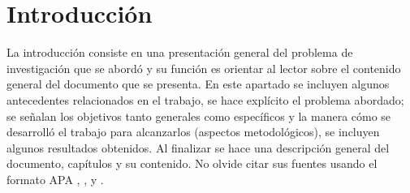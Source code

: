 \chapter{Introducción}



La introducción consiste en una presentación general del problema de 
investigación que se abordó y su función es orientar al lector sobre 
el contenido general del documento que se presenta. En este apartado 
se incluyen algunos antecedentes relacionados en el trabajo, se hace 
explícito el problema abordado; se señalan los objetivos tanto generales 
como específicos y la manera cómo se desarrolló el trabajo para 
alcanzarlos (aspectos metodológicos), se incluyen algunos resultados 
obtenidos. Al finalizar se hace una descripción general del documento, 
capítulos y su contenido. No olvide citar sus fuentes usando el formato 
\gls{APA} \cite{style2020apa}, \cite{wiki:Plagiarism}, y \cite{Goniwada2022}.
